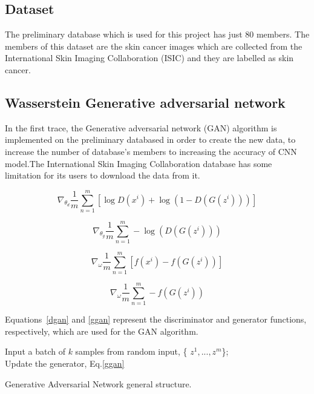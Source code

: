 \documentclass[conference]{IEEEtran}
\begin{document}
\subsection{Dataset}
The preliminary database which is used for this project has just 80 members. The members of this dataset are the skin cancer images which are collected from the International Skin Imaging Collaboration (ISIC) and they are labelled as skin cancer. 
\subsection{Wasserstein Generative adversarial network}
In the first trace, the Generative adversarial network (GAN) algorithm is implemented on the preliminary databased in order to create the new data, to increase the number of database's members to increasing the accuracy of CNN model.The International Skin Imaging Collaboration database has some limitation for its users to download the data from it.


\begin{equation}
\nabla_{\theta_{d}}\frac{1}{m}\sum_{n=1}^{m}[\log D(x^{i})+\log(1-D(G(z^{i})))]
\label{dgan}
\end{equation}

\begin{equation}
\nabla_{\theta_{g}}\frac{1}{m}\sum_{n=1}^{m} -\log(D(G(z^{i})))
\label{ggan}
\end{equation}



\begin{equation}
\nabla_{\omega}\frac{1}{m}\sum_{n=1}^{m}[f(x^{i})-f(G(z^{i}))]
\label{cwgan}
\end{equation}




\begin{equation}
\nabla_{\omega}\frac{1}{m}\sum_{n=1}^{m} -f(G(z^{i}))
\label{gwgan}
\end{equation}

Equations~\ref{dgan} and \ref{ggan} represent the discriminator and generator functions, respectively, which are used for the GAN algorithm. 

\begin{algorithm}[t]
 {
    Input a batch of $k$ samples from random input, \{ $z^{1}, . . . ,    z^{m}$\};\\
    Update the generator, Eq.\ref{ggan}
  }
  
 \caption{Generative Adversarial Network general structure.}
\end{algorithm}
\end{document}
